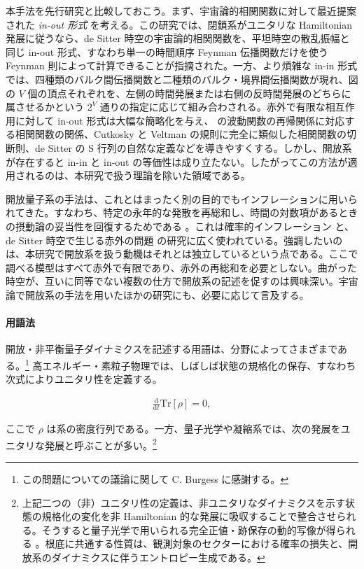 \documentclass[a4paper,11pt]{ltjsarticle}
\numberwithin{equation}{section}
\newcommand{\dd}{\mathrm{d}}
\begin{document}
本手法を先行研究と比較しておこう。まず、宇宙論的相関関数に対して最近提案された \textit{in-out 形式} \cite{Donath:2024utn} を考える。この研究では、閉鎖系がユニタリな Hamiltonian 発展に従うなら、de Sitter 時空の宇宙論的相関関数を、平坦時空の散乱振幅と同じ in-out 形式、すなわち単一の時間順序 Feynman 伝播関数だけを使う Feynman 則によって計算できることが指摘された。一方、より煩雑な in-in 形式では、四種類のバルク間伝播関数と二種類のバルク・境界間伝播関数が現れ、図の $V$ 個の頂点それぞれを、左側の時間発展または右側の反時間発展のどちらに属させるかという $2^V$ 通りの指定に応じて組み合わされる。赤外で有限な相互作用に対して in-out 形式は大幅な簡略化を与え、\cite{Arkani-Hamed:2017fdk} の波動関数の再帰関係に対応する相関関数の関係、Cutkosky と Veltman の規則に完全に類似した相関関数の切断則、de Sitter の S 行列の自然な定義などを導きやすくする。しかし、開放系が存在すると in-in と in-out の等価性は成り立たない。したがってこの方法が適用されるのは、本研究で扱う理論を除いた領域である。

開放量子系の手法は、これとはまったく別の目的でもインフレーションに用いられてきた。すなわち、特定の永年的な発散を再総和し、時間の対数項があるときの摂動論の妥当性を回復するためである \cite{Burgess:2015ajz,Burgess:2024eng}。これは確率的インフレーション \cite{Starobinsky:1986fx,Starobinsky:1994bd} と、de Sitter 時空で生じる赤外の問題 \cite{Gorbenko:2019rza,Cespedes:2023aal} の研究に広く使われている。強調したいのは、本研究で開放系を扱う動機はそれとは独立しているという点である。ここで調べる模型はすべて赤外で有限であり、赤外の再総和を必要としない。曲がった時空が、互いに同等でない複数の仕方で開放系の記述を促すのは興味深い。宇宙論で開放系の手法を用いたほかの研究にも、必要に応じて言及する。

\paragraph{用語法} 開放・非平衡量子ダイナミクスを記述する用語は、分野によってさまざまである。\footnote{この問題についての議論に関して C. Burgess に感謝する。} 高エネルギー・素粒子物理では、しばしば状態の規格化の保存、すなわち次式によりユニタリ性を定義する。

\begin{align}
\frac{\dd }{\dd t} \mathrm{Tr}[\rho]  = 0,
\end{align}

ここで $\rho$ は系の密度行列である。一方、量子光学や凝縮系では、次の発展をユニタリな発展と呼ぶことが多い。\footnote{上記二つの（非）ユニタリ性の定義は、非ユニタリなダイナミクスを示す状態の規格化の変化を非 Hamiltonian 的な発展に吸収することで整合させられる。そうすると量子光学で用いられる完全正値・跡保存の動的写像が得られる \cite{breuerTheoryOpenQuantum2002}。根底に共通する性質は、観測対象のセクターにおける確率の損失と、開放系のダイナミクスに伴うエントロピー生成である。}
\end{document}
